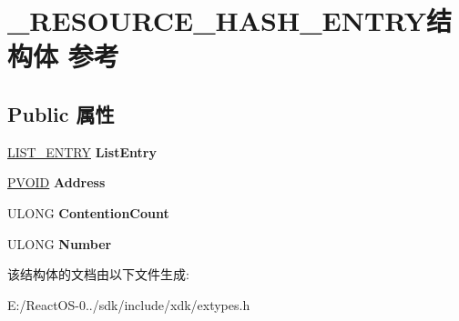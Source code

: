 \hypertarget{struct___r_e_s_o_u_r_c_e___h_a_s_h___e_n_t_r_y}{}\section{\+\_\+\+R\+E\+S\+O\+U\+R\+C\+E\+\_\+\+H\+A\+S\+H\+\_\+\+E\+N\+T\+R\+Y结构体 参考}
\label{struct___r_e_s_o_u_r_c_e___h_a_s_h___e_n_t_r_y}
\subsection*{Public 属性}
\begin{DoxyCompactItemize}
\item 
\mbox{\label{struct___r_e_s_o_u_r_c_e___h_a_s_h___e_n_t_r_y_a2a4be743a207e64e5bdfb0b348a5f23b}} 
\hyperlink{struct___l_i_s_t___e_n_t_r_y}{L\+I\+S\+T\+\_\+\+E\+N\+T\+RY} {\bfseries List\+Entry}
\item 
\mbox{\label{struct___r_e_s_o_u_r_c_e___h_a_s_h___e_n_t_r_y_a285bd078eb58ce4c7afa9f9d3dc91383}} 
\hyperlink{interfacevoid}{P\+V\+O\+ID} {\bfseries Address}
\item 
\mbox{\label{struct___r_e_s_o_u_r_c_e___h_a_s_h___e_n_t_r_y_a51b70554faf64431d5838fee4cb163f2}} 
U\+L\+O\+NG {\bfseries Contention\+Count}
\item 
\mbox{\label{struct___r_e_s_o_u_r_c_e___h_a_s_h___e_n_t_r_y_a26d907a84cb98441ef88a9fac9ae3d2f}} 
U\+L\+O\+NG {\bfseries Number}
\end{DoxyCompactItemize}


该结构体的文档由以下文件生成\+:\begin{DoxyCompactItemize}
\item 
E\+:/\+React\+O\+S-\/0../sdk/include/xdk/extypes.\+h\end{DoxyCompactItemize}
